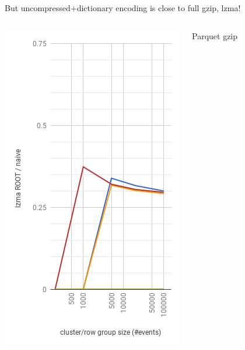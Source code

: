 \documentclass[aspectratio=169]{beamer}
\begin{document}
\begin{frame}{But uncompressed$+$dictionary encoding is close to full gzip, lzma!}
\begin{columns}
\begin{center}
\includegraphics[width=\linewidth]{root-lzma.png}
\end{center}
\begin{center}
\mbox{\hspace{3 cm}}
Parquet gzip


\end{center}
\end{columns}
\end{frame}
\end{document}
